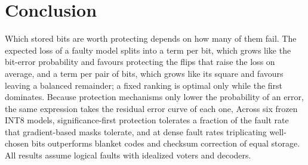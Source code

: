 \section{Conclusion}\label{sec:conclusion}
Which stored bits are worth protecting depends on how many of them fail. The expected loss of a faulty model splits into a term per bit, which grows like the bit-error probability and favours protecting the flips that raise the loss on average, and a term per pair of bits, which grows like its square and favours leaving a balanced remainder; a fixed ranking is optimal only while the first dominates.  Because protection mechanisms only lower the probability of an error, the same expression takes the residual error curve of each one,  Across six frozen INT8 models, significance-first protection tolerates a fraction of the fault rate that gradient-based masks tolerate, and at dense fault rates triplicating well-chosen bits outperforms blanket codes and checksum correction of equal storage. All results assume logical faults with idealized voters and decoders.
